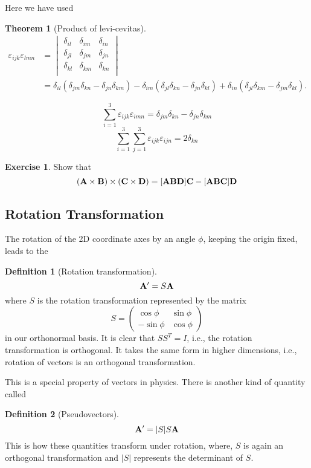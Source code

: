 \documentclass[10pt, a4paper]{extarticle}
\theoremstyle{definition}
\newtheorem{thm}{Theorem}
\newtheorem{defn}{Definition}
\newtheorem{ex}{Exercise}
\begin{document}
Here we have used
\begin{thm}[Product of levi-cevitas]
	\begin{align*}
		\varepsilon_{ijk}\varepsilon_{lmn} & = \begin{vmatrix}
			\delta_{il} & \delta_{im} & \delta_{in} \\
			\delta_{jl} & \delta_{jm} & \delta_{jn} \\
			\delta_{kl} & \delta_{km} & \delta_{kn} \\
		\end{vmatrix}                                                                                                                                                                                                          \\[6pt]
		                                   & = \delta_{il}\left( \delta_{jm}\delta_{kn} - \delta_{jn}\delta_{km}\right) - \delta_{im}\left( \delta_{jl}\delta_{kn} - \delta_{jn}\delta_{kl} \right) + \delta_{in} \left( \delta_{jl}\delta_{km} - \delta_{jm}\delta_{kl} \right).
	\end{align*}

	\[\sum_{i=1}^3 \varepsilon_{ijk}\varepsilon_{imn} = \delta_{jm}\delta_{kn} - \delta_{jn}\delta_{km}\]
	\[\sum_{i=1}^3 \sum_{j=1}^3 \varepsilon_{ijk}\varepsilon_{ijn} = 2\delta_{kn}\]
\end{thm}

\begin{ex}
	Show that
	\[(\vb{A}\times\vb{B})\times(\vb{C}\times\vb{D})=[\vb{ABD}]\vb{C}-[\vb{ABC}]\vb{D}\]
\end{ex}

\subsection{Rotation Transformation}
The rotation of the 2D coordinate axes by an angle $\phi$, keeping the origin fixed, leads to the
\begin{framed}
	\begin{defn}[Rotation transformation]
		\[\vb{A'}=S\vb{A}\]
		where $S$ is the rotation transformation represented by the matrix
		\[S=\left(\begin{matrix}
					\cos\phi  & \sin\phi \\
					-\sin\phi & \cos\phi
				\end{matrix}\right)\] in our orthonormal basis.
		It is clear that $SS^T=I$, i.e., the rotation transformation is orthogonal. It takes the same form in higher dimensions, i.e., rotation of vectors is an orthogonal transformation.
	\end{defn}
\end{framed}
This is a special property of vectors in physics. There is another kind of quantity called
\begin{framed}
	\begin{defn}[Pseudovectors]
		\[\vb{A'}=|S|S\vb{A}\]
		This is how these quantities transform under rotation, where, $S$ is again an orthogonal transformation and $|S|$ represents the determinant of $S$.
	\end{defn}
\end{framed}
\end{document}
